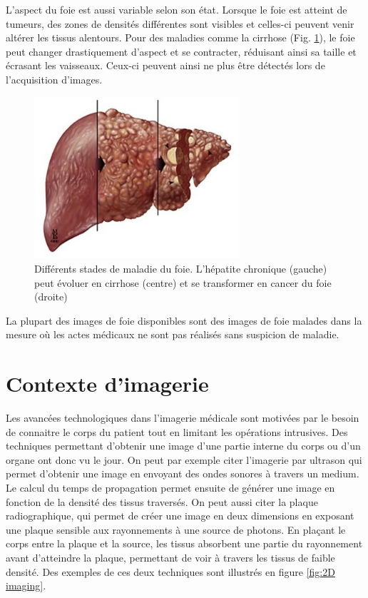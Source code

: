 L'aspect du foie est aussi variable selon son état. Lorsque le foie est atteint de tumeurs, des zones de densités différentes sont visibles et celles-ci peuvent venir altérer les tissus alentours. Pour des maladies comme la cirrhose (Fig. \ref{fig:unhealthy liver}), le foie peut changer drastiquement d'aspect et se contracter, réduisant ainsi sa taille et écrasant les vaisseaux. Ceux-ci peuvent ainsi ne plus être détectés lors de l'acquisition d'images. 

\begin{figure}
    \centering
    \includegraphics[height=6cm]{Images/Liver_cirrhosis_stages.jpg}
    \caption{Différents stades de maladie du foie. L'hépatite chronique (gauche) peut évoluer en cirrhose (centre) et se transformer en cancer du foie (droite)\protect \footnotemark}
    \label{fig:unhealthy liver}
\end{figure}

La plupart des images de foie disponibles sont des images de foie malades dans la mesure où les actes médicaux ne sont pas réalisés sans suspicion de maladie.



\section{Contexte d'imagerie}
\label{sec:contexte:images}

Les avancées technologiques dans l'imagerie médicale sont motivées par le besoin de connaitre le corps du patient tout en limitant les opérations intrusives. Des techniques permettant d'obtenir une image d'une partie interne du corps ou d'un organe ont donc vu le jour. On peut par exemple citer l'imagerie par ultrason qui permet d'obtenir une image en envoyant des ondes sonores à travers un medium. Le calcul du temps de propagation permet ensuite de générer une image en fonction de la densité des tissus traversés. On peut aussi citer la plaque radiographique, qui permet de créer une image en deux dimensions en exposant une plaque sensible aux rayonnements à une source de photons. En plaçant le corps entre la plaque et la source, les tissus absorbent une partie du rayonnement avant d'atteindre la plaque, permettant de voir à travers les tissus de faible densité. Des exemples de ces deux techniques sont illustrés en figure \ref{fig:2D imaging}.

